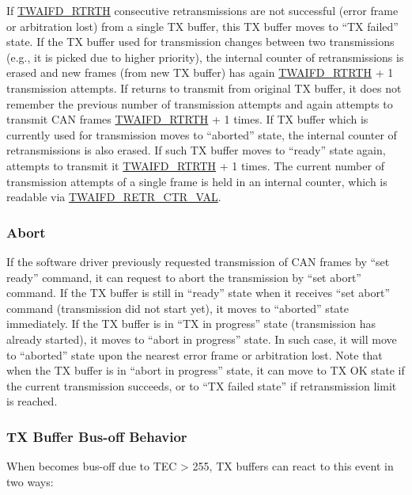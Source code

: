 \documentclass[main\_\_EN.tex]{subfiles}
\begin{document}
If \hyperref[fielddesc:TWAIFDRTRTH]{TWAIFD\_RTRTH} consecutive retransmissions are not successful (error frame or arbitration lost) from a single TX buffer, this TX buffer moves to ``TX failed'' state. If the TX buffer used for transmission changes between two transmissions (e.g., it is picked due to higher priority), the internal counter of retransmissions is erased and new frames (from new TX buffer) has again \hyperref[fielddesc:TWAIFDRTRTH]{TWAIFD\_RTRTH} + 1 transmission attempts. If \modulename{} returns to transmit from original TX buffer, it does not remember the previous number of transmission attempts and again attempts to transmit CAN frames \hyperref[fielddesc:TWAIFDRTRTH]{TWAIFD\_RTRTH} + 1 times. If TX buffer which is currently used for transmission moves to ``aborted'' state, the internal counter of retransmissions is also erased. If such TX buffer moves to ``ready'' state again, \modulename{} attempts to transmit it \hyperref[fielddesc:TWAIFDRTRTH]{TWAIFD\_RTRTH} + 1 times. The current number of transmission attempts of a single frame is held in an internal counter, which is readable via \hyperref[fielddesc:TWAIFDRETRCTRVAL]{TWAIFD\_RETR\_CTR\_VAL}.


\subsubsection{Abort}

If the software driver previously requested transmission of CAN frames by ``set ready'' command, it can request to abort the transmission by ``set abort'' command. If the TX buffer is still in ``ready'' state when it receives ``set abort'' command (transmission did not start yet), it moves to ``aborted'' state immediately. If the TX buffer is in ``TX in progress'' state (transmission has already started), it moves to ``abort in progress'' state. In such case, it will move to ``aborted'' state upon the nearest error frame or arbitration lost. Note that when the TX buffer is in ``abort in progress'' state, it can move to TX OK state if the current transmission succeeds, or to ``TX failed state'' if retransmission limit is reached.

\subsubsection{TX Buffer Bus-off Behavior}

When \modulename{} becomes bus-off due to TEC > 255, TX buffers can react to this event in two ways:
\end{document}
